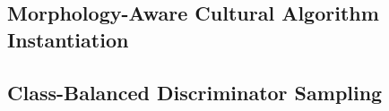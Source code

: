 \documentclass[letterpaper]{article} %
\begin{document}
\subsection{Morphology-Aware Cultural Algorithm Instantiation}

\subsection{Class-Balanced Discriminator Sampling}


\end{document}
